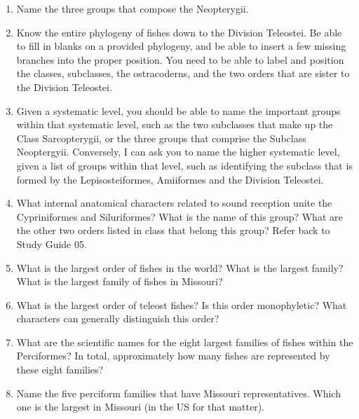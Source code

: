 \documentclass[letterpaper]{tufte-handout}
\begin{document}
\begin{enumerate}
	\item Name the three groups that compose the Neopterygii.

	\item Know the entire phylogeny of fishes down to the Division Teleostei.  Be able to fill in blanks on a provided phylogeny, and be able to insert a few missing branches into the proper position.  You need to be able to label and position the classes, subclasses, the ostracoderns, and the two orders that are sister to the Division Teleostei.

	\item Given a systematic level, you should be able to name the important groups within that systematic level, such as the two subclasses that make up the Class Sarcopterygii, or the three groups that comprise the Subclass Neoptergyii.  Conversely, I can ask you to name the higher systematic level, given a list of groups within that level, such as identifying the subclass that is formed by the Lepisosteiformes, Amiiformes and the Division Teleostei.

	\item What internal anatomical characters related to sound reception unite the Cypriniformes and Siluriformes?  What is the name of this group?  What are the other two orders listed in class that belong this group? Refer back to Study Guide 05.

	\item What is the largest order of fishes in the world?  What is the largest family?  What is the largest family of fishes in Missouri?

	\item What is the largest order of teleost fishes?  Is this order monophyletic?  What characters can generally distinguish this order?

	\item What are the scientific names for the eight largest families of fishes within the Perciformes?  In total, approximately how many fishes are represented by these eight families?  

	\item Name the five perciform families that have Missouri representatives.  Which one is the largest in Missouri (in the US for that matter).

\end{enumerate}
\end{document}
